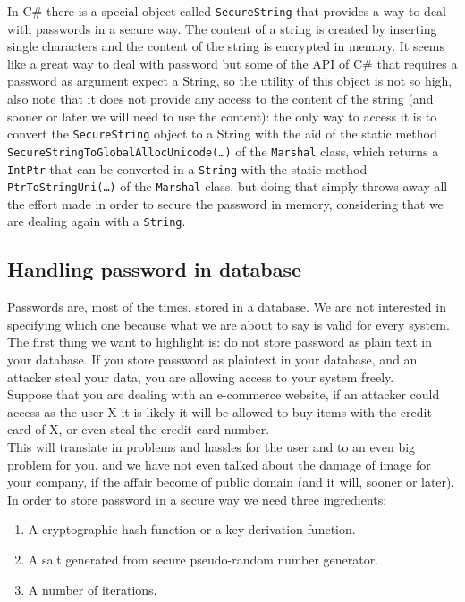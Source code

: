 In C\# there is a special object called \texttt{SecureString} that provides a way to deal with passwords in a secure way. The content of a string is created by inserting single characters and the content of the string is encrypted in memory.\newline
It seems like a great way to deal with password but some of the API of C\# that requires a password as argument expect a String, so the utility of this object is not so high, also note that it does not provide any access to the content of the string (and sooner or later we will need to use the content): the only way to access it is to convert the \texttt{SecureString} object to a String with the aid of the static method \texttt{SecureStringToGlobalAllocUnicode(…)} of the \texttt{Marshal} class, which returns a \texttt{IntPtr} that can be converted in a \texttt{String} with the static method \texttt{PtrToStringUni(…)} of the \texttt{Marshal} class, but doing that simply throws away all the effort made in order to secure the password in memory, considering that we are dealing again with a \texttt{String}.\newline

\subsection{Handling password in database}
Passwords are, most of the times, stored in a database. We are not interested in specifying which one because what we are about to say is valid for every system.\newline
The first thing we want to highlight is: do not store password as plain text in your database.\newline
If you store password as plaintext in your database, and an attacker steal your data, you are allowing access to your system freely.\\

Suppose that you are dealing with an e-commerce website, if an attacker could access as the user X it is likely it will be allowed to buy items with the credit card of X, or even steal the credit card number.\\
This will translate in problems and hassles for the user and to an even big problem for you, and we have not even talked about the damage of image for your company, if the affair become of public domain (and it will, sooner or later).\\
In order to store password in a secure way we need three ingredients:
\begin{enumerate}
	\item A cryptographic hash function or a key derivation function.
	\item A salt generated from secure pseudo-random number generator.
	\item A number of iterations.
\end{enumerate}

